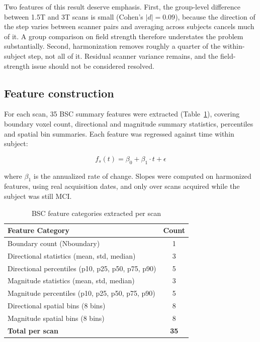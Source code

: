 \documentclass[blue]{ludusofficial}  %
\begin{document}
Two features of this result deserve emphasis. First, the group-level difference between 1.5T and 3T scans is small (Cohen's $|d| = 0.09$), because the direction of the step varies between scanner pairs and averaging across subjects cancels much of it. A group comparison on field strength therefore understates the problem substantially. Second, harmonization removes roughly a quarter of the within-subject step, not all of it. Residual scanner variance remains, and the field-strength issue should not be considered resolved.


\subsection{Feature construction}

For each scan, 35 BSC summary features were extracted (Table~\ref{tab:bsc-features}), covering boundary voxel count, directional and magnitude summary statistics, percentiles and spatial bin summaries. Each feature was regressed against time within subject:

\begin{equation}
    f_s(t) = \beta_0 + \beta_1 \cdot t + \epsilon
\end{equation}

where $\beta_1$ is the annualized rate of change. Slopes were computed on harmonized features, using real acquisition dates, and only over scans acquired while the subject was still MCI.

\begin{table}[htbp]
\centering
\caption{BSC feature categories extracted per scan}
\label{tab:bsc-features}
\begin{tabular}{lc}
\hline
\textbf{Feature Category} & \textbf{Count} \\
\hline
Boundary count (Nboundary) & 1 \\
Directional statistics (mean, std, median) & 3 \\
Directional percentiles (p10, p25, p50, p75, p90) & 5 \\
Magnitude statistics (mean, std, median) & 3 \\
Magnitude percentiles (p10, p25, p50, p75, p90) & 5 \\
Directional spatial bins (8 bins) & 8 \\
Magnitude spatial bins (8 bins) & 8 \\
\hline
\textbf{Total per scan} & \textbf{35} \\
\hline
\end{tabular}
\end{table}
\end{document}
